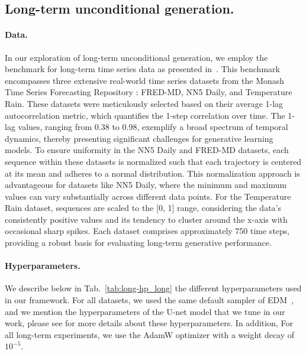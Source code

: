 \documentclass{article}
\begin{document}
\subsection{Long-term unconditional generation.} 
\label{app:log-term_uncond_details}

\paragraph{Data.} In our exploration of long-term unconditional generation, we employ the benchmark for long-term time series data as presented in~\cite{zhou2023deep}. This benchmark encompasses three extensive real-world time series datasets from the Monash Time Series Forecasting Repository \cite{godahewa2021monash}: FRED-MD, NN5 Daily, and Temperature Rain. These datasets were meticulously selected based on their average 1-lag autocorrelation metric, which quantifies the 1-step correlation over time. The 1-lag values, ranging from 0.38 to 0.98, exemplify a broad spectrum of temporal dynamics, thereby presenting significant challenges for generative learning models. To ensure uniformity in the NN5 Daily and FRED-MD datasets, each sequence within these datasets is normalized such that each trajectory is centered at its mean and adheres to a normal distribution. This normalization approach is advantageous for datasets like NN5 Daily, where the minimum and maximum values can vary substantially across different data points. For the Temperature Rain dataset, sequences are scaled to the [0, 1] range, considering the data's consistently positive values and its tendency to cluster around the x-axis with occasional sharp spikes. Each dataset comprises approximately 750 time steps, providing a robust basis for evaluating long-term generative performance.

\paragraph{Hyperparameters.} We describe below in Tab.~\ref{tab:long-hp_long} the different hyperparameters used in our framework. For all datasets, we used the same default sampler of EDM~\cite{karras2022elucidating}, and we mention the hyperparameters of the U-net model that we tune in our work, please see \cite{karras2022elucidating} for more details about these hyperparameters. In addition, For all long-term experiments, we use the AdamW optimizer with a weight decay of $10^{-5}$.
\end{document}
